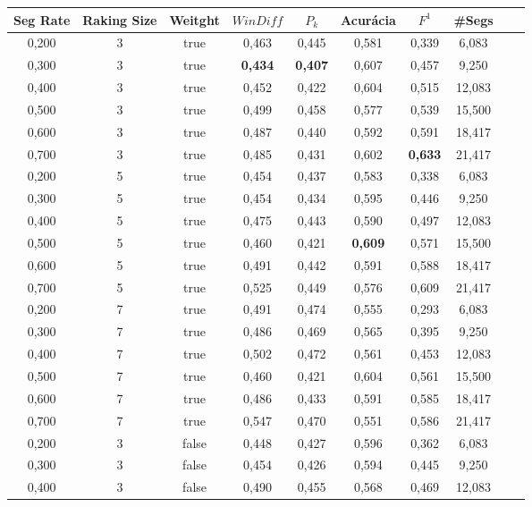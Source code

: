 \documentclass{article}
\begin{document}
\begin{longtable}[c]{|c|c|c|c|c|c|c|c|c|c|} 
\hline 
 Seg Rate & Raking Size & Weitght & $WinDiff$ & $P_k$ & Acurácia & $F^1$ & \#Segs\\ \hline 
 0,200 & 3 & true & 0,463 & 0,445 & 0,581 & 0,339 & 6,083  \\ \hline 
 0,300 & 3 & true & \cellcolor{gray!20} \textbf{0,434} & \cellcolor{gray!20} \textbf{0,407} & 0,607 & 0,457 & 9,250  \\ \hline 
 0,400 & 3 & true & 0,452 & 0,422 & 0,604 & 0,515 & 12,083  \\ \hline 
 0,500 & 3 & true & 0,499 & 0,458 & 0,577 & 0,539 & 15,500  \\ \hline 
 0,600 & 3 & true & 0,487 & 0,440 & 0,592 & 0,591 & 18,417  \\ \hline 
 0,700 & 3 & true & 0,485 & 0,431 & 0,602 & \cellcolor{gray!20} \textbf{0,633} & 21,417  \\ \hline 
 0,200 & 5 & true & 0,454 & 0,437 & 0,583 & 0,338 & 6,083  \\ \hline 
 0,300 & 5 & true & 0,454 & 0,434 & 0,595 & 0,446 & 9,250  \\ \hline 
 0,400 & 5 & true & 0,475 & 0,443 & 0,590 & 0,497 & 12,083  \\ \hline 
 0,500 & 5 & true & 0,460 & 0,421 & \cellcolor{gray!20} \textbf{0,609} & 0,571 & 15,500  \\ \hline 
 0,600 & 5 & true & 0,491 & 0,442 & 0,591 & 0,588 & 18,417  \\ \hline 
 0,700 & 5 & true & 0,525 & 0,449 & 0,576 & 0,609 & 21,417  \\ \hline 
 0,200 & 7 & true & 0,491 & 0,474 & 0,555 & 0,293 & 6,083  \\ \hline 
 0,300 & 7 & true & 0,486 & 0,469 & 0,565 & 0,395 & 9,250  \\ \hline 
 0,400 & 7 & true & 0,502 & 0,472 & 0,561 & 0,453 & 12,083  \\ \hline 
 0,500 & 7 & true & 0,460 & 0,421 & 0,604 & 0,561 & 15,500  \\ \hline 
 0,600 & 7 & true & 0,486 & 0,433 & 0,591 & 0,585 & 18,417  \\ \hline 
 0,700 & 7 & true & 0,547 & 0,470 & 0,551 & 0,586 & 21,417  \\ \hline 
 0,200 & 3 & false & 0,448 & 0,427 & 0,596 & 0,362 & 6,083  \\ \hline 
 0,300 & 3 & false & 0,454 & 0,426 & 0,594 & 0,445 & 9,250  \\ \hline 
 0,400 & 3 & false & 0,490 & 0,455 & 0,568 & 0,469 & 12,083  \\ \hline 

\end{longtable}
\end{document}
